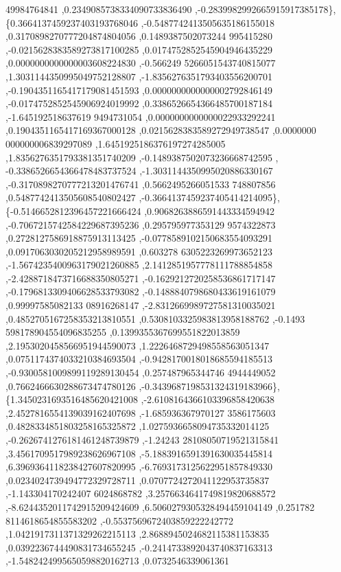 \begin{DoxyCode}
      49984764841 ,0.2349085738334090733836490 ,-0.2839982992665915917385178\},
\{0.3664137459237403193768046 ,-0.5487742413505635186155018 ,0.3170898270777204874804056 ,0.1489387502073244
      995415280 ,-0.0215628383589273817100285 ,0.0174752852545904946435229 ,0.0000000000000003608224830 ,-0.566249
      5266051543740815077 ,1.3031144350995049752128807 ,-1.8356276351793403556200701 ,-0.1904351165417179081451593
       ,0.0000000000000002792846149 ,-0.0174752852545906924019992 ,0.3386526654366485700187184 ,-1.645192518637619
      9494731054 ,0.0000000000000022933292241 ,0.1904351165417169367000128 ,0.0215628383589272949738547 ,0.0000000
      000000006839297089 ,1.6451925186376197274285005 ,1.8356276351793381351740209 ,-0.1489387502073236668742595 ,
      -0.3386526654366478483737524 ,-1.3031144350995020886330167 ,-0.3170898270777213201476741 ,0.5662495266051533
      748807856 ,0.5487742413505608540802427 ,-0.3664137459237405414214095\},
\{-0.5146652812396457221666424 ,0.9068263886591443334594942 ,-0.7067215742584229687395236 ,0.295795977353129
      9574322873 ,0.2728127586918875913113425 ,-0.0778589102150683554093291 ,0.0917063030205212958989591 ,0.603278
      6305223269973652123 ,-1.5674235400963179021260885 ,2.1412851957778111788854858 ,-2.4288718473716688350805271
       ,-0.1629212720258536861717147 ,-0.1796813309406628533793082 ,-0.1488840798680433619161079 ,0.99997585082133
      08916268147 ,-2.8312669989727581310035021 ,0.4852705167258353213810551 ,0.5308103325983813958188762 ,-0.1493
      598178904554096835255 ,0.1399355367699551822013859 ,2.1953020458566951944590073 ,1.2226468729498558563051347
       ,0.0751174374033210384693504 ,-0.9428170018018685594185513 ,-0.9300581009899119289130454 ,0.257487965344746
      4944449052 ,0.7662466630288673474780126 ,-0.3439687198531324319183966\},
\{1.3450231693516485620421008 ,-2.6108164366103396858420638 ,2.4527816554139039162407698 ,-1.685936367970127
      3586175603 ,0.4828334851803258165325872 ,1.0275936658094735332014125 ,-0.2626741276181461248739879 ,-1.24243
      28108050719521315841 ,3.4561709517989238626967108 ,-5.1883916591391630035445814 ,6.3969364118238427607820995
       ,-6.7693173125622951857849330 ,0.0234024739494772329728711 ,0.0707724272041122953735837 ,-1.143304170242407
      6024868782 ,3.2576634641749819820688572 ,-8.6244352011742915209424609 ,6.5060279305328494459104149 ,0.251782
      8114618654855583202 ,-0.5537569672403859222242772 ,1.0421917311371329262215113 ,2.8688945024682115381153835 
      ,0.0392236744490831734655245 ,-0.2414733892043740837163313 ,-1.5482424995650598820162713 ,0.0732546339061361

\end{DoxyCode}
